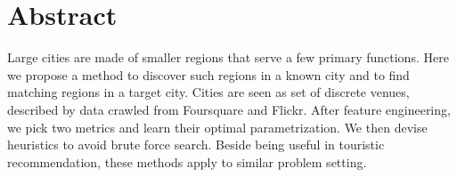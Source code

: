 \begingroup
\let\clearpage\relax
\let\cleardoublepage\relax
\let\cleardoublepage\relax

\chapter*{Abstract}

Large cities are made of smaller regions that serve a few primary functions.
Here we propose a method to discover such regions in a known city and to find
matching regions in a target city. Cities are seen as set of discrete venues,
described by data crawled from Foursquare and Flickr. After feature
engineering, we pick two metrics and learn their optimal parametrization. We
then devise heuristics to avoid brute force search. Beside being useful in
touristic recommendation, these methods apply to similar problem setting.


\endgroup 

\vfill
